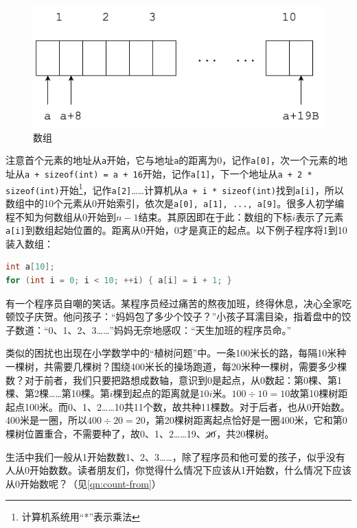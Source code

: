 \documentclass[b5paper]{ctexart}
\begin{document}
\begin{figure}[htbp]
 \centering
 \includegraphics[scale=0.35]{img/array}
 \caption{数组}
 \label{fig:array}
\end{figure}

注意首个元素的地址从\lstinline|a|开始，它与地址\lstinline|a|的距离为0，记作\lstinline|a[0]|，次一个元素的地址从\lstinline|a + sizeof(int) = a + 16|开始，记作\lstinline|a[1]|，下一个地址从\lstinline|a + 2 * sizeof(int)|开始\footnote{计算机系统用“*”表示乘法}，记作\lstinline|a[2]|……计算机从\lstinline|a + i * sizeof(int)|找到\lstinline|a[i]|，所以数组中的10个元素从0开始索引，依次是\lstinline|a[0], a[1], ..., a[9]|。很多人初学编程不知为何数组从0开始到$n-1$结束。其原因即在于此：数组的下标$i$表示了元素\lstinline|a[i]|到数组起始位置的。距离从0开始，0才是真正的起点。以下例子程序将1到10装入数组：

\begin{lstlisting}[language=C, frame=single]
int a[10];
for (int i = 0; i < 10; ++i) { a[i] = i + 1; }
\end{lstlisting}

有一个程序员自嘲的笑话。某程序员经过痛苦的熬夜加班，终得休息，决心全家吃顿饺子庆贺。他问孩子：“妈妈包了多少个饺子？”小孩子耳濡目染，指着盘中的饺子数道：“0、1、2、3……”妈妈无奈地感叹：“天生加班的程序员命。”

类似的困扰也出现在小学数学中的“植树问题”中。一条100米长的路，每隔10米种一棵树，共需要几棵树？围绕400米长的操场跑道，每20米种一棵树，需要多少棵数？对于前者，我们只要把路想成数轴，意识到0是起点，从0数起：第0棵、第1棵、第2棵……第10棵。第$i$棵到起点的距离就是$10i$米。$100 \div 10 = 10$故第10棵树距起点100米。而0、1、2……10共11个数，故共种11棵数。对于后者，也从0开始数。400米是一圈，所以$400 \div 20 = 20$，第20棵树距离起点恰好是一圈400米，它和第0棵树位置重合，不需要种了，故0、1、2……19、$\cancel{20}$，共20棵树。

生活中我们一般从1开始数数1、2、3……，除了程序员和他可爱的孩子，似乎没有人从0开始数数。读者朋友们，你觉得什么情况下应该从1开始数，什么情况下应该从0开始数呢？（见\cref{qn:count-from}）
\end{document}
